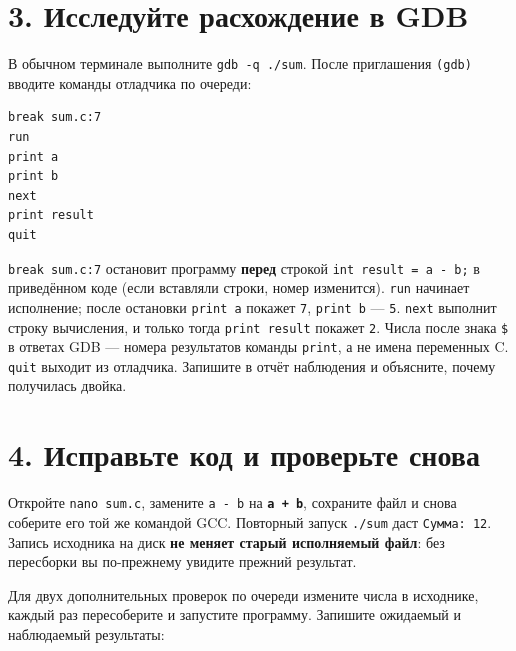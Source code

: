 \hypertarget{3-ux438ux441ux441ux43bux435ux434ux443ux439ux442ux435-ux440ux430ux441ux445ux43eux436ux434ux435ux43dux438ux435-ux432-gdb}{%
\section{3. Исследуйте расхождение в
GDB}\label{3-ux438ux441ux441ux43bux435ux434ux443ux439ux442ux435-ux440ux430ux441ux445ux43eux436ux434ux435ux43dux438ux435-ux432-gdb}}

В обычном терминале выполните \texttt{gdb\ -q\ ./sum}. После приглашения
\texttt{(gdb)} вводите команды отладчика по очереди:

\begin{verbatim}
break sum.c:7
run
print a
print b
next
print result
quit
\end{verbatim}

\texttt{break\ sum.c:7} остановит программу \textbf{перед} строкой
\texttt{int\ result\ =\ a\ -\ b;} в приведённом коде (если вставляли
строки, номер изменится). \texttt{run} начинает исполнение; после
остановки \texttt{print\ a} покажет \texttt{7}, \texttt{print\ b} ---
\texttt{5}. \texttt{next} выполнит строку вычисления, и только тогда
\texttt{print\ result} покажет \texttt{2}. Числа после знака \texttt{\$}
в ответах GDB --- номера результатов команды \texttt{print}, а не имена
переменных C. \texttt{quit} выходит из отладчика. Запишите в отчёт
наблюдения и объясните, почему получилась двойка.

\hypertarget{4-ux438ux441ux43fux440ux430ux432ux44cux442ux435-ux43aux43eux434-ux438-ux43fux440ux43eux432ux435ux440ux44cux442ux435-ux441ux43dux43eux432ux430}{%
\section{4. Исправьте код и проверьте
снова}\label{4-ux438ux441ux43fux440ux430ux432ux44cux442ux435-ux43aux43eux434-ux438-ux43fux440ux43eux432ux435ux440ux44cux442ux435-ux441ux43dux43eux432ux430}}

Откройте \texttt{nano\ sum.c}, замените \texttt{a\ -\ b} на
\textbf{\texttt{a\ +\ b}}, сохраните файл и снова соберите его той же
командой GCC. Повторный запуск \texttt{./sum} даст \texttt{Сумма:\ 12}.
Запись исходника на диск \textbf{не меняет старый исполняемый файл}: без
пересборки вы по-прежнему увидите прежний результат.

Для двух дополнительных проверок по очереди измените числа в исходнике,
каждый раз пересоберите и запустите программу. Запишите ожидаемый и
наблюдаемый результаты:

